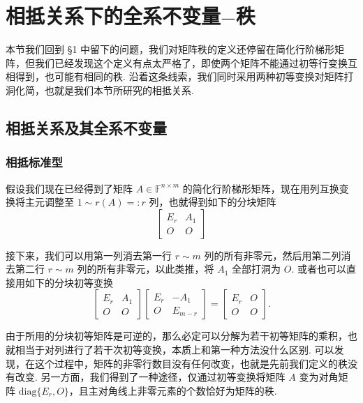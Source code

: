 \documentclass[10pt,openany]{article}
\theoremstyle{thmstyle} %
\theoremstyle{defstyle} %
\theoremstyle{prostyle} %
\theoremstyle{exastyle}
\theoremstyle{remstyle}
\newcommand{\F}{\mathbb{F}}
\newcommand{\nm}{^{n \times m}}
\newcommand{\diag}{\mathrm{diag}}
\begin{document}
\pagestyle{fancy}
\rhead{\today}
	
\setcounter{section}{2}


\section{相抵关系下的全系不变量\(-\)秩}

本节我们回到 \S 1 中留下的问题，我们对矩阵秩的定义还停留在简化行阶梯形矩阵，但我们已经发现这个定义有点太严格了，即使两个矩阵不能通过初等行变换互相得到，也可能有相同的秩. 沿着这条线索，我们同时采用两种初等变换对矩阵打洞化简，也就是我们本节所研究的相抵关系. 

\subsection{相抵关系及其全系不变量}

\subsubsection{相抵标准型}

假设我们现在已经得到了矩阵 \( A \in \F\nm \) 的简化行阶梯形矩阵，现在用列互换变换将主元调整至 \( 1 \sim r(A)=:r \) 列，也就得到如下的分块矩阵
\[ \begin{bmatrix}
	E_r & A_1 \\
	O & O
\end{bmatrix} \]

接下来，我们可以用第一列消去第一行 \( r \sim m \) 列的所有非零元，然后用第二列消去第二行 \( r \sim m \) 列的所有非零元，以此类推，将 \( A_1 \) 全部打洞为 \( O \). 或者也可以直接用如下的分块初等变换
\[ \begin{bmatrix}
	E_r & A_1 \\
	O & O
\end{bmatrix}\begin{bmatrix}
E_r & -A_1 \\
O & E_{m-r}
\end{bmatrix}=\begin{bmatrix}
E_r & O \\
O & O
\end{bmatrix}. \]

由于所用的分块初等矩阵是可逆的，那么必定可以分解为若干初等矩阵的乘积，也就相当于对列进行了若干次初等变换，本质上和第一种方法没什么区别. 可以发现，在这个过程中，矩阵的非零行数目没有任何改变，也就是先前我们定义的秩没有改变. 另一方面，我们得到了一种途径，仅通过初等变换将矩阵 \( A \) 变为对角矩阵 \( \diag\{E_r,O\} \)，且主对角线上非零元素的个数恰好为矩阵的秩. 
\end{document}

